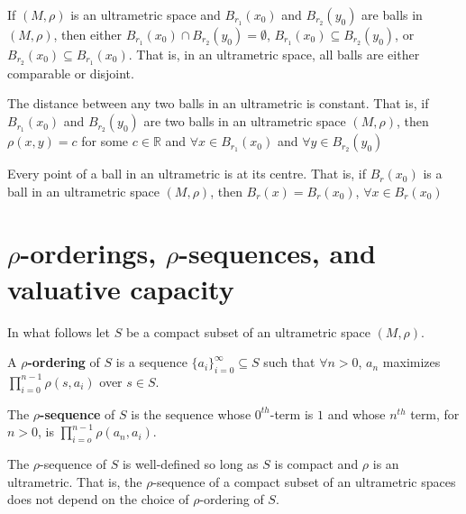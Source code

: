 \begin{proposition*}
	If $(M, \rho)$ is an ultrametric space and $B_{r_1}(x_0)$ and $B_{r_2}(y_0)$ are balls in $(M, \rho)$, then either $B_{r_1}(x_0) \cap B_{r_2}(y_0) = \emptyset$, $B_{r_1}(x_0) \subseteq B_{r_2}(y_0)$, or $B_{r_2}(x_0) \subseteq B_{r_1}(x_0)$. That is, in an ultrametric space, all balls are either comparable or disjoint.
\end{proposition*}

\begin{proposition*}
\cite{ar} The distance between any two balls in an ultrametric is constant. That is, if $B_{r_1}(x_0)$ and $B_{r_2}(y_0)$ are two balls in an ultrametric space $(M,\rho)$, then $\rho(x,y)=c$ for some $c \in \mathbb{R}$ and $\forall x \in B_{r_1}(x_0)$ and $\forall y \in B_{r_2}(y_0)$
\end{proposition*}

\begin{proposition*}
\cite{ar} Every point of a ball in an ultrametric is at its centre. That is, if $B_r(x_0)$ is a ball in an ultrametric space $(M,\rho)$, then $B_r(x)=B_r(x_0)$,  $\forall x \in B_r(x_0)$
\end{proposition*}


\newpage
\section*{$\rho$-orderings, $\rho$-sequences, and valuative capacity}

In what follows let $S$ be a compact subset of an ultrametric space $(M,\rho)$.

\begin{definition*}
	\cite{kj} A \textbf{$\rho$-ordering} of $S$ is a sequence $\{a_i\}_{i=0}^\infty \subseteq S$ such that $\forall n > 0$, $a_n$ maximizes $\prod_{i=0}^{n-1} \rho(s,a_i)$ over $s \in S$. 
\end{definition*}

\begin{definition*}
	\cite{kj} The \textbf{$\rho$-sequence} of $S$ is the sequence whose $0^{th}$-term is $1$ and whose $n^{th}$ term, for $n >0$, is $\prod_{i=o}^{n-1} \rho(a_n,a_i)$.
\end{definition*}

\begin{proposition*}
	\cite{kj} The $\rho$-sequence of $S$ is well-defined so long as $S$ is compact and $\rho$ is an ultrametric. That is, the $\rho$-sequence of a compact subset of an ultrametric spaces does not depend on the choice of $\rho$-ordering of $S$.
\end{proposition*}

